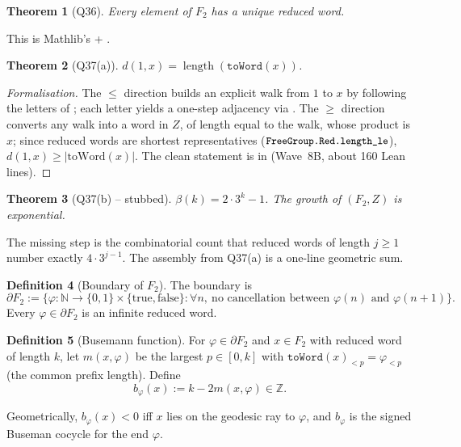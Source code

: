 \documentclass[11pt,a4paper]{article}
\newcommand{\N}{\mathbb{N}}
\newcommand{\Z}{\mathbb{Z}}
\newcommand{\BFG}{\partial F_2}
\newcommand{\busem}{b}
\theoremstyle{plain}
\newtheorem{theorem}{Theorem}[section]
\theoremstyle{definition}
\newtheorem{definition}[theorem]{Definition}
\begin{document}
\begin{theorem}[Q36]
Every element of $F_2$ has a unique reduced word.
\end{theorem}

This is Mathlib's  + .

\begin{theorem}[Q37(a)]
$d(1, x) = \operatorname{length}(\texttt{toWord}(x))$.
\end{theorem}

\begin{proof}[Formalisation]
The $\leq$ direction builds an explicit walk from $1$ to $x$ by
following the letters of ; each letter yields a one-step
adjacency via . The $\geq$ direction
converts any walk into a word in $Z$, of length equal to the walk,
whose product is $x$; since reduced words are shortest representatives
($\texttt{\small FreeGroup.Red.length\_le}$), $d(1,x) \geq |\text{toWord}(x)|$.
The clean statement is in 
(Wave~8B, about 160 Lean lines).
\end{proof}

\begin{theorem}[Q37(b) -- stubbed]
$\beta(k) = 2 \cdot 3^k - 1$. The growth of $(F_2, Z)$ is
exponential.
\end{theorem}

The missing step is the combinatorial count that reduced words of
length $j \geq 1$ number exactly $4 \cdot 3^{j-1}$. The assembly from
Q37(a) is a one-line geometric sum.

\begin{definition}[Boundary of $F_2$]
The boundary is
\[ \BFG := \{\varphi : \N \to \{0,1\}\times\{\text{true}, \text{false}\}
   : \forall n,\ \text{no cancellation between } \varphi(n)\text{ and }\varphi(n+1)\}. \]
Every $\varphi \in \BFG$ is an infinite reduced word.
\end{definition}

\begin{definition}[Busemann function]\label{def:busemann}
For $\varphi \in \BFG$ and $x \in F_2$ with reduced word of length
$k$, let $m(x, \varphi)$ be the largest $p \in [0, k]$ with
$\texttt{toWord}(x)_{<p} = \varphi_{<p}$ (the common prefix length).
Define
\[ \busem_\varphi(x) := k - 2 m(x, \varphi) \in \Z. \]
\end{definition}

Geometrically, $\busem_\varphi(x) < 0$ iff $x$ lies on the geodesic
ray to $\varphi$, and $\busem_\varphi$ is the signed Buseman cocycle
for the end $\varphi$.
\end{document}
